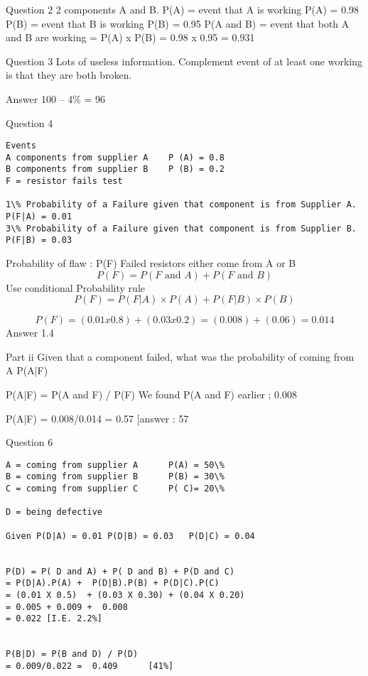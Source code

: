 \documentclass[]{report}
\begin{document}
Question 2 
2 components A and B.
P(A) = event that A is working		P(A) = 0.98
P(B) = event that B is working			P(B) = 0.95
P(A and B) = event that both A and B are working = P(A) x P(B) = 0.98 x 0.95 = 0.931

Question 3
Lots of useless information.
Complement event of at least one working is that they are both broken.

Answer  100 – 4\% = 96%

Question 4


\begin{verbatim}
Events 
A components from supplier A  	P (A) = 0.8 
B components from supplier B  	P (B) = 0.2 
F = resistor fails test

1\% Probability of a Failure given that component is from Supplier A.      P(F|A) = 0.01
3\% Probability of a Failure given that component is from Supplier B.      P(F|B) = 0.03

\end{verbatim}
Probability of flaw : P(F)
Failed resistors either come from A or B
\[	P( F) =  P ( F \mbox{ and } A)  +  P( F \mbox{ and } B)\]
Use conditional Probability  rule		
\[P(F) = P(F|A)\times P(A)  + P(F|B)\times P(B)\]

\[P(F)  =  ( 0.01 x 0.8 ) + ( 0.03 x 0.2) = (0.008) + (0.06) = 0.014	\]
	Answer 1.4%

Part ii
Given that a component failed, what was the probability of coming from A
P(A|F) 

P(A|F) = P(A and F)  / P(F)		We found P(A and F) earlier ; 0.008

P(A|F) = 0.008/0.014 =  0.57			[answer : 57%
















Question 6

\begin{verbatim}
A = coming from supplier A		P(A) = 50\%
B = coming from supplier B		P(B) = 30\%	
C = coming from supplier C		P( C)= 20\%

D = being defective

Given P(D|A) = 0.01	P(D|B) = 0.03	P(D|C) = 0.04


P(D) = P( D and A) + P( D and B) + P(D and C)
= P(D|A).P(A) +  P(D|B).P(B) + P(D|C).P(C)
= (0.01 X 0.5)  + (0.03 X 0.30) + (0.04 X 0.20)
= 0.005 + 0.009 +  0.008
= 0.022 [I.E. 2.2%]


P(B|D) = P(B and D) / P(D)  
= 0.009/0.022 =  0.409		[41%]
\end{verbatim}
\end{document}
